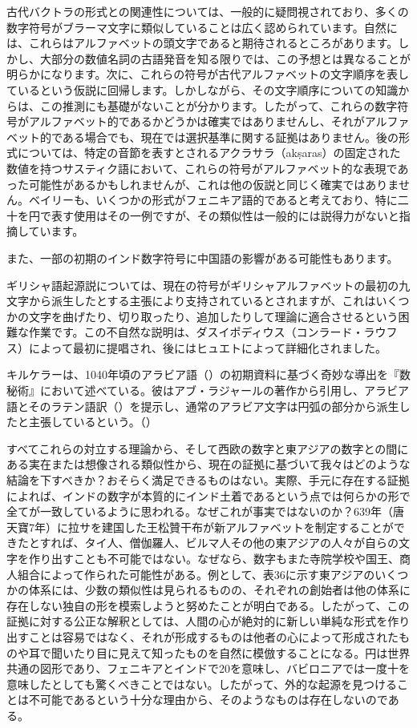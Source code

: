 \documentclass[a4paper,11pt,openany]{ltjsbook}
\begin{document}
古代バクトラの形式との関連性については、一般的に疑問視されており、多くの数字符号がブラーマ文字に類似していることは広く認められています。自然には、これらはアルファベットの頭文字であると期待されるところがあります。しかし、大部分の数値名詞の古語発音を知る限りでは、この予想とは異なることが明らかになります。次に、これらの符号が古代アルファベットの文字順序を表しているという仮説に回帰します。しかしながら、その文字順序についての知識からは、この推測にも基礎がないことが分かります。したがって、これらの数字符号がアルファベット的であるかどうかは確実ではありませんし、それがアルファベット的である場合でも、現在では選択基準に関する証拠はありません。後の形式については、特定の音節を表すとされるアクラサラ（akṣaras）の固定された数値を持つサスティク語において、これらの符号がアルファベット的な表現であった可能性があるかもしれませんが、これは他の仮説と同じく確実ではありません。ベイリーも、いくつかの形式がフェニキア語的であると考えており、特に二十を円で表す使用はその一例ですが、その類似性は一般的には説得力がないと指摘しています。

また、一部の初期のインド数字符号に中国語の影響がある可能性もあります。

ギリシャ語起源説については、現在の符号がギリシャアルファベットの最初の九文字から派生したとする主張により支持されているとされますが、これはいくつかの文字を曲げたり、切り取ったり、追加したりして理論に適合させるという困難な作業です。この不自然な説明は、ダスイポディウス（コンラード・ラウフス）によって最初に提唱され、後にはヒュエトによって詳細化されました。

キルケラーは、1040年頃のアラビア語（）の初期資料に基づく奇妙な導出を『数秘術』において述べている。彼はアブ・ラジャールの著作から引用し、アラビア語とそのラテン語訳（）を提示し、通常のアラビア文字は円弧の部分から派生したと主張しているという。（）

すべてこれらの対立する理論から、そして西欧の数字と東アジアの数字との間にある実在または想像される類似性から、現在の証拠に基づいて我々はどのような結論を下すべきか？おそらく満足できるものはない。実際、手元に存在する証拠によれば、インドの数字が本質的にインド土着であるという点では何らかの形で全てが一致しているように思われる。なぜこれが事実ではないのか？639年（唐天寶7年）に拉サを建国した王松贊干布が新アルファベットを制定することができたとすれば、タイ人、僧伽羅人、ビルマ人その他の東アジアの人々が自らの文字を作り出すことも不可能ではない。なぜなら、数字もまた寺院学校や国王、商人組合によって作られた可能性がある。例として、表36に示す東アジアのいくつかの体系には、少数の類似性は見られるものの、それぞれの創始者は他の体系に存在しない独自の形を模索しようと努めたことが明白である。したがって、この証拠に対する公正な解釈としては、人間の心が絶対的に新しい単純な形式を作り出すことは容易ではなく、それが形成するものは他者の心によって形成されたものや耳で聞いたり目に見えて知ったものを自然に模倣することになる。円は世界共通の図形であり、フェニキアとインドで20を意味し、バビロニアでは一度十を意味したとしても驚くべきことではない。したがって、外的な起源を見つけることは不可能であるという十分な理由から、そのようなものは存在しないのである。
\end{document}
